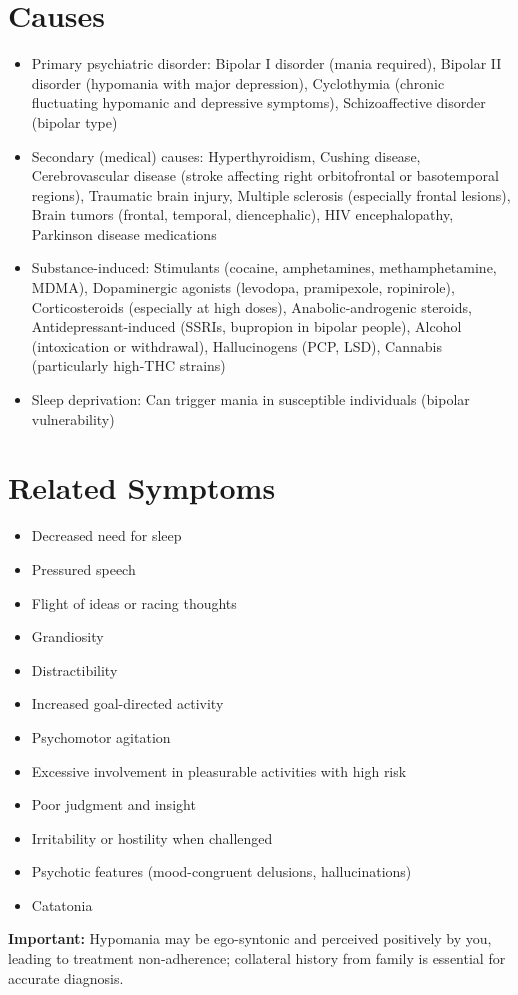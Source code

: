 \section*{Causes}
\begin{itemize}
  \item Primary psychiatric disorder: Bipolar I disorder (mania required), Bipolar II disorder (hypomania with major depression), Cyclothymia (chronic fluctuating hypomanic and depressive symptoms), Schizoaffective disorder (bipolar type)
  \item Secondary (medical) causes: Hyperthyroidism, Cushing disease, Cerebrovascular disease (stroke affecting right orbitofrontal or basotemporal regions), Traumatic brain injury, Multiple sclerosis (especially frontal lesions), Brain tumors (frontal, temporal, diencephalic), HIV encephalopathy, Parkinson disease medications
  \item Substance-induced: Stimulants (cocaine, amphetamines, methamphetamine, MDMA), Dopaminergic agonists (levodopa, pramipexole, ropinirole), Corticosteroids (especially at high doses), Anabolic-androgenic steroids, Antidepressant-induced (SSRIs, bupropion in bipolar people), Alcohol (intoxication or withdrawal), Hallucinogens (PCP, LSD), Cannabis (particularly high-THC strains)
  \item Sleep deprivation: Can trigger mania in susceptible individuals (bipolar vulnerability)
\end{itemize}

\section*{Related Symptoms}
\begin{itemize}
  \item Decreased need for sleep
  \item Pressured speech
  \item Flight of ideas or racing thoughts
  \item Grandiosity
  \item Distractibility
  \item Increased goal-directed activity
  \item Psychomotor agitation
  \item Excessive involvement in pleasurable activities with high risk
  \item Poor judgment and insight
  \item Irritability or hostility when challenged
  \item Psychotic features (mood-congruent delusions, hallucinations)
  \item Catatonia
\end{itemize}
\textbf{Important:} Hypomania may be ego-syntonic and perceived positively by you, leading to treatment non-adherence; collateral history from family is essential for accurate diagnosis.

